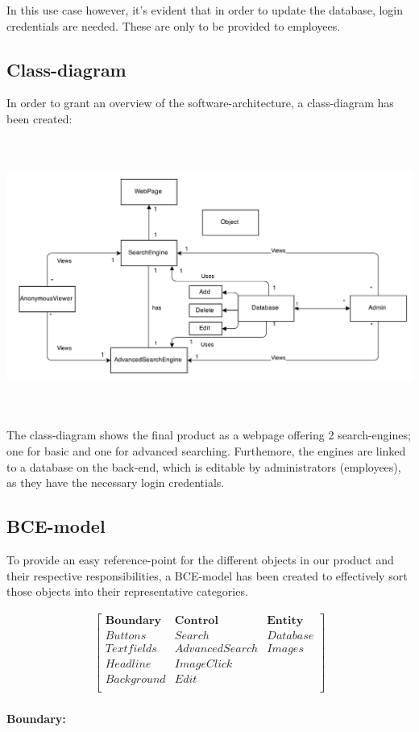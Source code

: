 \documentclass[12pt,a4paper]{article}
\begin{document}
In this use case however, it's evident that in order to update the database, login credentials are needed. These are only to be provided to employees.
\newpage

\subsection{Class-diagram}

In order to grant an overview of the software-architecture, a class-diagram has been created:

\includegraphics[height=90mm]{ClassDiagram.png}

The class-diagram shows the final product as a webpage offering 2 search-engines; one for basic and one for advanced searching.
Furthemore, the engines are linked to a database on the back-end, which is editable by administrators (employees), as they have the necessary login credentials. 
\newpage
\subsection{BCE-model}

To provide an easy reference-point for the different objects in our product and their respective responsibilities, a BCE-model has been created to effectively sort those objects into their representative categories.

\begin{gather*}
\begin{bmatrix}
\textbf{Boundary}&\textbf{Control}&\textbf{Entity}\\
Buttons&Search&Database\\
Textfields&Advanced Search&Images\\
Headline&ImageClick\\
Background&Edit\\
\end{bmatrix}
\end{gather*}\\
\textbf{Boundary:}\\
\end{document}
